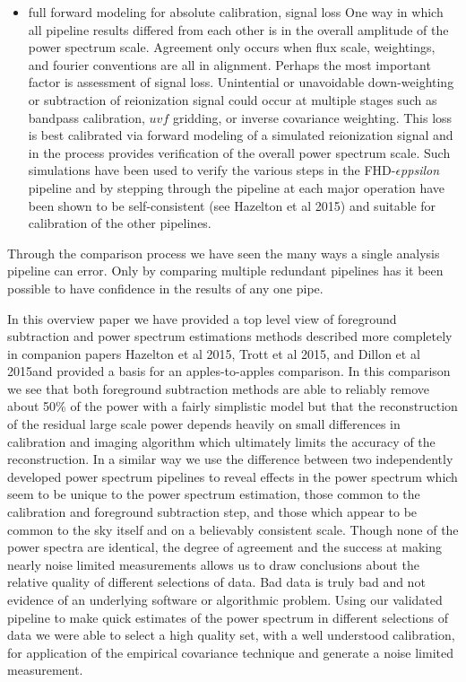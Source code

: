\documentclass[preprint]{aastex}
\def\eppsilon{{\it $\epsilon$ppsilon }}
\def\chipscite{Trott et al 2015}
\def\eppsiloncite{Hazelton et al 2015}
\def\dilloncite{Dillon et al 2015}
\begin{document}
\begin{itemize}
\item full forward modeling for absolute calibration, signal loss
One way in which all pipeline results differed from each other is in the overall amplitude of the power spectrum scale. Agreement only occurs when flux scale, weightings, and fourier conventions are all in alignment.  Perhaps the most important factor is assessment of signal loss.  Unintential or unavoidable down-weighting or subtraction of reionization signal could occur at multiple stages such as bandpass calibration, $uvf$ gridding, or inverse covariance weighting. This loss is best calibrated via forward modeling of a simulated reionization signal and in the process provides verification of the overall power spectrum scale.  Such simulations have been used to verify the various steps in the FHD-\eppsilon pipeline and by stepping through the pipeline at each major operation have been shown to be self-consistent (see \eppsiloncite) and suitable for calibration of the other pipelines.
\end{itemize}

Through the comparison process we have seen the many ways a single analysis pipeline can error.  Only by comparing multiple redundant pipelines has it been possible to have confidence in the results of any one pipe.


In this overview paper we have provided a top level view of foreground subtraction and power spectrum estimations methods described more completely in companion papers \eppsiloncite, \chipscite, and \dilloncite and provided a basis for an apples-to-apples comparison.  In this comparison we see that both foreground subtraction methods are able to reliably remove about 50\% of the power with a fairly simplistic model but that the reconstruction of the residual large scale power depends heavily on small differences in calibration and imaging algorithm which ultimately limits the accuracy of the reconstruction.  In a similar way we use the difference between two independently developed power spectrum pipelines to reveal effects in the power spectrum which seem to be unique to the power spectrum estimation, those common to the calibration and foreground subtraction step, and those which appear to be common to the sky itself and on a believably consistent scale.  Though none of the power spectra are identical, the degree of agreement and the success at making nearly noise limited measurements allows us to draw conclusions about the relative quality of different selections of data.  Bad data is truly bad and not evidence of an underlying software or algorithmic problem.  Using our validated pipeline to make quick estimates of the power spectrum in different selections of data we were able to select a high quality set, with a well understood calibration, for application of the empirical  covariance technique and generate a noise limited measurement. 
\end{document}
